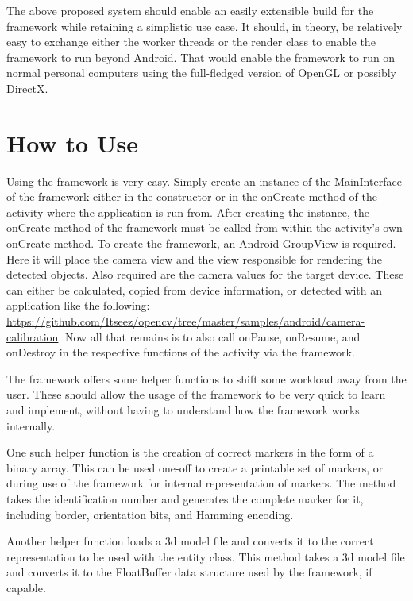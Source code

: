 The above proposed system should enable an easily extensible build for the framework while retaining a simplistic use case.
It should, in theory, be relatively easy to exchange either the worker threads or the render class to enable the framework to run beyond Android.
That would enable the framework to run on normal personal computers using the full-fledged version of OpenGL or possibly DirectX.

\section{How to Use}

Using the framework is very easy.
Simply create an instance of the MainInterface of the framework either in the constructor or in the onCreate method of the activity where the application is run from.
After creating the instance, the onCreate method of the framework must be called from within the activity's own onCreate method.
To create the framework, an Android GroupView is required.
Here it will place the camera view and the view responsible for rendering the detected objects. Also required are the camera values for the target device.
These can either be calculated, copied from device information, or detected with an application like the following: \url{https://github.com/Itseez/opencv/tree/master/samples/android/camera-calibration}.
Now all that remains is to also call onPause, onResume, and onDestroy in the respective functions of the activity via the framework.

The framework offers some helper functions to shift some workload away from the user.
These should allow the usage of the framework to be very quick to learn and implement, without having to understand how the framework works internally.

One such helper function is the creation of correct markers in the form of a binary array.
This can be used one-off to create a printable set of markers, or during use of the framework for internal representation of markers.
The method takes the identification number and generates the complete marker for it, including border, orientation bits, and Hamming encoding.

Another helper function loads a 3d model file and converts it to the correct representation to be used with the entity class.
This method takes a 3d model file and converts it to the FloatBuffer data structure used by the framework, if capable.
